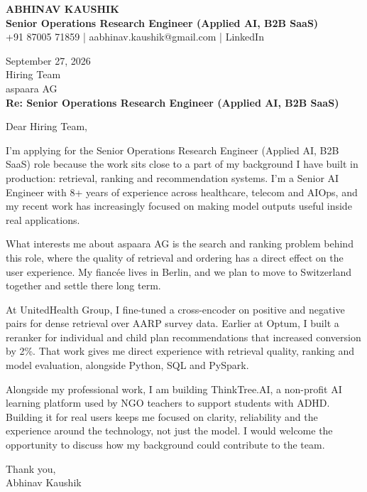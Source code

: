 \documentclass[10pt,a4paper]{article}
\begin{document}
\begin{center}
{\Large\bfseries ABHINAV KAUSHIK}\\[2pt]
{\bfseries Senior Operations Research Engineer (Applied AI, B2B SaaS)}\\[2pt]
+91 87005 71859 \quad | \quad aabhinav.kaushik@gmail.com \quad | \quad LinkedIn
\end{center}
\vspace{8pt}
September 27, 2026\\[6pt]
Hiring Team\\
aspaara AG\\[4pt]
\textbf{Re: Senior Operations Research Engineer (Applied AI, B2B SaaS)}

Dear Hiring Team,

I’m applying for the Senior Operations Research Engineer (Applied AI, B2B SaaS) role because the work sits close to a part of my background I have built in production: retrieval, ranking and recommendation systems. I’m a Senior AI Engineer with 8+ years of experience across healthcare, telecom and AIOps, and my recent work has increasingly focused on making model outputs useful inside real applications.

What interests me about aspaara AG is the search and ranking problem behind this role, where the quality of retrieval and ordering has a direct effect on the user experience. My fiancée lives in Berlin, and we plan to move to Switzerland together and settle there long term.

At UnitedHealth Group, I fine-tuned a cross-encoder on positive and negative pairs for dense retrieval over AARP survey data. Earlier at Optum, I built a reranker for individual and child plan recommendations that increased conversion by 2\%. That work gives me direct experience with retrieval quality, ranking and model evaluation, alongside Python, SQL and PySpark.

Alongside my professional work, I am building ThinkTree.AI, a non-profit AI learning platform used by NGO teachers to support students with ADHD. Building it for real users keeps me focused on clarity, reliability and the experience around the technology, not just the model. I would welcome the opportunity to discuss how my background could contribute to the team.

Thank you,\\
Abhinav Kaushik
\end{document}
